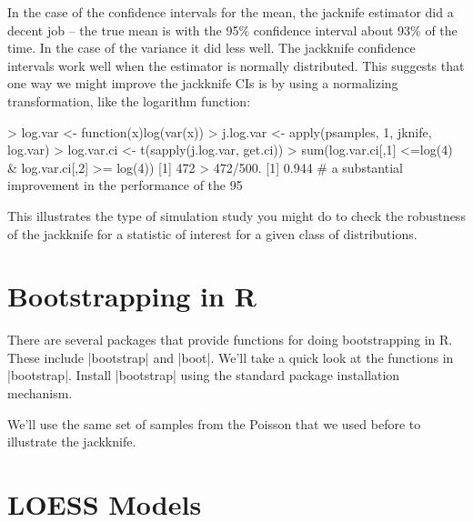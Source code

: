 In the case  of the confidence intervals for the mean, the jacknife estimator did a decent job -- the true mean is with the 95\% confidence interval about 93\% of the time.  In the case of the variance it did less well.  The jackknife confidence intervals work well when the estimator is normally distributed. This suggests that one way we might improve the jackknife CIs is by using a normalizing transformation, like the logarithm function:

\begin{R}
> log.var <- function(x){log(var(x))}
> j.log.var <- apply(psamples, 1, jknife, log.var)
> log.var.ci <- t(sapply(j.log.var, get.ci))
> sum(log.var.ci[,1] <=log(4) & log.var.ci[,2] >= log(4))
[1] 472
> 472/500.
[1] 0.944
# a substantial improvement in the performance of the 95%
\end{R}

This illustrates the type of simulation study you might do to check the robustness of the jackknife for a statistic of interest for a given class of distributions.

\section{Bootstrapping in R}

There are several packages that provide functions for doing bootstrapping in R. These include |bootstrap| and |boot|. We'll take a quick look at the functions in |bootstrap|. Install |bootstrap| using the standard package installation mechanism.

We'll use the same set of samples from the Poisson that we used before to illustrate the jackknife.



\section{LOESS Models}

